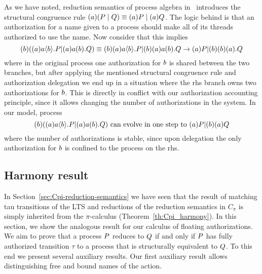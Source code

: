 \begin{example}
\label{ex_machinery}
As we have noted, reduction semantics of process algebra in~\cite{DBLP:journals/corr/GhilezanJPPV16, clar:eke}  introduces the  structural congruence rule $(a) (P \;|\; Q)\equiv (a)  P \;|\; (a) Q$. The logic behind is that an authorization for a name given to a process should make all of its threads authorized to use the name. Now consider that this implies 
\[
  (b)( (a) a\langle b\rangle.P | (a) a(b).Q ) \equiv 
  (b) (a) a\langle b\rangle.P | (b)(a) a(b).Q \rightarrow 
  (a) P  | (b) (b)(a).Q 
\]
where in the original process one authorization for $b$ is shared between the two branches, but after applying the mentioned structural congruence rule and authorization delegation we end up in a situation where the rhs branch owns two authorizations for $b$.
This is directly in conflict with our authorization accounting principle, since it allows changing the number of authorizations in the system. %
In our model, process
\[
 (b)( (a) a\langle b\rangle.P | (a) a(b).Q )
\text{ can evolve in one step to }
(a) P | (b) (a) Q
\]
where the number of authorizations is stable, since upon delegation the only authorization for $b$ is confined to the process on the rhs. 
%
\end{example}


\subsection{Harmony result}\label{sec:harmony_result}
In Section~\ref{sec:Cpi-reduction-semantics} we have seen that the result of matching tau transitions of the LTS and reductions of the reduction semantics in $C_\pi$ is simply inherited from the $\pi$-calculus (Theorem~\ref{th:Cpi_harmony}). 
In this section, we show the analogous result for our calculus of floating authorizations. We aim to prove that a process $P$ reduces to $Q$ if and only if $P$ has fully authorized transition $\tau$ to a process that is structurally equivalent to $Q$. To this end we present several auxiliary results.
Our first auxiliary result allows distinguishing free and bound names of the action.


